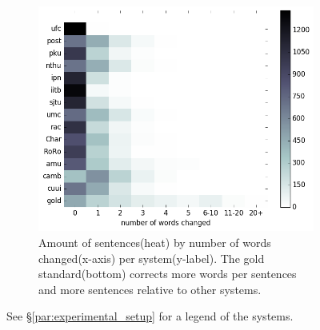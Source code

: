 \documentclass[letterpaper, 11pt]{article}
\newcommand{\com}[1]{}
\begin{document}
{\begin{figure}
  \begin{subfigure}[]{0.4\textwidth}
  	\includegraphics[width = \textwidth]{words_differences_heat}
  	\caption{Amount of sentences(heat) by number of words changed(x-axis) per system(y-label). The gold standard(bottom) corrects more words per sentences and more sentences relative to other systems.\label{fig:words_changed}}
  \end{subfigure}
  \com{\caption{(a) Number of source sentences (y-axis) split 
  		(right bars) or concatenated (left bars) in the correction, according to the gold standard (striped column) and different correctors (colored columns). The gold standard makes about an order of magnitude more splits and concatenations than the correctors.\\
  		(b) Empirical cumulative probability (y-axis) of a sentence to get Spearman's rho values (x-axis) of word alignment. The gold standard(dotted line) makes word change alterations to more sentences than the correctors, and within these sentences, it changes order more substantially.\\
  		(c) Amount of sentences(heat) by number of words changed(x-axis) per system(y-label). The gold standard(bottom) corrects more words per sentences and more sentences relative to other systems.\\
  		See \S\ref{par:experimental_setup} for a legend
  		of the systems.}\label{fig:over-conservatism}}
  \caption{\label{fig:over-conservatism}
    See \S\ref{par:experimental_setup} for a legend
    of the systems.}
  	\end{figure}
}
\end{document}
